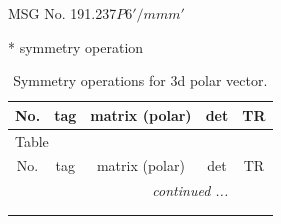 \documentclass[fleqn,8pt]{jsarticle}
\begin{document}
\setcounter{MaxMatrixCols}{32}

\renewcommand{\tablename}{Table~}
\renewcommand{\figurename}{Figure~}
\begin{center}
\LARGE
MSG No. 191.237\quad$P6'/mmm'$
\end{center}
* symmetry operation
\renewcommand{\arraystretch}{1.3}
\begin{longtable}{ccccc}
\caption{Symmetry operations for 3d polar vector.}
 \\
 \hline \hline
No. & tag & matrix (polar) & det & TR \\ \hline \endfirsthead

\multicolumn{4}{l}{\tablename\ \thetable{}} \\
 \hline \hline
No. & tag & matrix (polar) & det & TR \\ \hline \endhead

 \hline \hline
\multicolumn{4}{r}{\footnotesize\it continued ...} \\ \endfoot

 \hline \hline
\multicolumn{4}{r}{} \\ \endlastfoot


\end{longtable}
\end{document}
